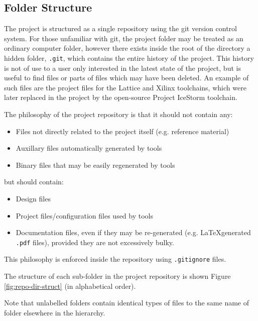 \clearpage
\begin{appendices}
	
\chapter{Folder Structure} \label{sec:folder-struct}

The project is structured as a single repository using the git version control system. For those unfamiliar with git, the project folder may be treated as an ordinary computer folder, however there exists inside the root of the directory a hidden folder, \texttt{.git}, which contains the entire history of the project. This history is not of use to a user only interested in the latest state of the project, but is useful to find files or parts of files which may have been deleted. An example of such files are the project files for the Lattice and Xilinx toolchains, which were later replaced in the project by the open-source Project IceStorm toolchain.

The philosophy of the project repository is that it should not contain any:
\begin{itemize}
	\item Files not directly related to the project itself (e.g. reference material)
	\item Auxillary files automatically generated by tools
	\item Binary files that may be easily regenerated by tools
\end{itemize}
but should contain:
\begin{itemize}
	\item Design files
	\item Project files/configuration files used by tools
	\item Documentation files, even if they may be re-generated (e.g. \LaTeX generated \texttt{.pdf} files), provided they are not excessively bulky.
\end{itemize}
This philosophy is enforced inside the repository using \texttt{.gitignore} files.


The structure of each sub-folder in the project repository is shown Figure \ref{fig:repo-dir-struct} (in alphabetical order).

Note that unlabelled folders contain identical types of files to the same name of folder elsewhere in the hierarchy.


\end{appendices}
